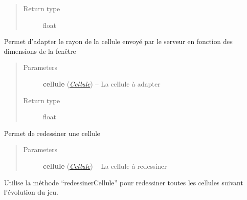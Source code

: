 \documentclass[letterpaper,10pt,english]{sphinxmanual}
\begin{document}
\begin{fulllineitems}
\begin{fulllineitems}
\begin{quote}
\begin{description}
\item[{Return type}] \leavevmode
float

\end{description}\end{quote}

\end{fulllineitems}


\begin{fulllineitems}
\label{index:Graphique.Graphique.getTrueRayonCellule}
Permet d'adapter le rayon de la cellule envoyé par le serveur en fonction des dimensions de la fenêtre
\begin{quote}\begin{description}
\item[{Parameters}] \leavevmode
\textbf{cellule} ({\hyperref[index:module-Cellule]{\emph{Cellule}}}) -- La cellule à adapter

\item[{Return type}] \leavevmode
float

\end{description}\end{quote}

\end{fulllineitems}


\begin{fulllineitems}
\label{index:Graphique.Graphique.redessinerCellule}
Permet de redessiner une cellule
\begin{quote}\begin{description}
\item[{Parameters}] \leavevmode
\textbf{cellule} ({\hyperref[index:module-Cellule]{\emph{Cellule}}}) -- La cellule à redessiner

\end{description}\end{quote}

\end{fulllineitems}


\begin{fulllineitems}
\label{index:Graphique.Graphique.redessinerCellules}
Utilise la méthode ``redessinerCellule'' pour redessiner toutes les cellules suivant l'évolution du jeu.

\end{fulllineitems}


\end{fulllineitems}
\end{document}
